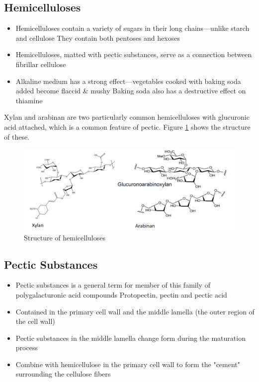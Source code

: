 \subsection*{Hemicelluloses}
\begin{itemize}
    \item Hemicelluloses contain a variety of sugars in their long
    chains—unlike starch and cellulose
    \subitem They contain both pentoses and hexoses
    
    \item Hemicelluloses, matted with pectic substances, serve as a
    connection between fibrillar cellulose
    
    \item Alkaline medium has a strong effect—vegetables cooked
    with baking soda added become flaccid \& mushy
    \subitem Baking soda also has a destructive effect on thiamine
\end{itemize}

\vspace{0.5em}
Xylan and arabinan are two particularly common hemicelluloses with
glucuronic acid attached, which is a common feature of pectic. Figure \ref{fig:L01_hemicelluloses} shows the structure of these.
\begin{figure}[ht]
    \centering
    \includegraphics[width=\textwidth]{figures/L01_hemicelluloses.png}
    \caption{Structure of hemicelluloses}
    \label{fig:L01_hemicelluloses}
\end{figure}

\subsection*{Pectic Substances}

\begin{itemize}
    \item Pectic substances is a general term for member
    of this family of polygalacturonic acid compounds
    \subitem Protopectin, pectin and pectic acid
    
    \item Contained in the primary cell wall and the middle lamella (the
    outer region of the cell wall)
    
    \item Pectic substances in the middle lamella change form during the
    maturation process
    
    \item Combine with hemicellulose in the primary cell wall to form the
    "cement" surrounding the cellulose fibers
\end{itemize}

